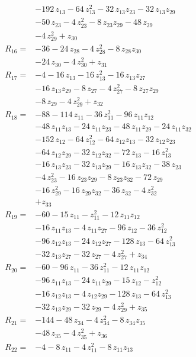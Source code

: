 \begin{align*}
&-192\,z_{13} -64\,z_{13}^{2} -32\,z_{13}z_{23} -32\,z_{13}z_{29}\\
&-50\,z_{23} -4\,z_{23}^{2} -8\,z_{23}z_{29} -48\,z_{29}\\
&-4\,z_{29}^{2} +z_{30}\\[2pt]
R_{16}={}&-36 -24\,z_{28} -4\,z_{28}^{2} -8\,z_{28}z_{30}\\
&-24\,z_{30} -4\,z_{30}^{2} +z_{31}\\[2pt]
R_{17}={}&-4 -16\,z_{13} -16\,z_{13}^{2} -16\,z_{13}z_{27}\\
&-16\,z_{13}z_{29} -8\,z_{27} -4\,z_{27}^{2} -8\,z_{27}z_{29}\\
&-8\,z_{29} -4\,z_{29}^{2} +z_{32}\\[2pt]
R_{18}={}&-88 -114\,z_{11} -36\,z_{11}^{2} -96\,z_{11}z_{12}\\
&-48\,z_{11}z_{13} -24\,z_{11}z_{23} -48\,z_{11}z_{29} -24\,z_{11}z_{32}\\
&-152\,z_{12} -64\,z_{12}^{2} -64\,z_{12}z_{13} -32\,z_{12}z_{23}\\
&-64\,z_{12}z_{29} -32\,z_{12}z_{32} -72\,z_{13} -16\,z_{13}^{2}\\
&-16\,z_{13}z_{23} -32\,z_{13}z_{29} -16\,z_{13}z_{32} -38\,z_{23}\\
&-4\,z_{23}^{2} -16\,z_{23}z_{29} -8\,z_{23}z_{32} -72\,z_{29}\\
&-16\,z_{29}^{2} -16\,z_{29}z_{32} -36\,z_{32} -4\,z_{32}^{2}\\
&+z_{33}\\[2pt]
R_{19}={}&-60 -15\,z_{11} -z_{11}^{2} -12\,z_{11}z_{12}\\
&-16\,z_{11}z_{13} -4\,z_{11}z_{27} -96\,z_{12} -36\,z_{12}^{2}\\
&-96\,z_{12}z_{13} -24\,z_{12}z_{27} -128\,z_{13} -64\,z_{13}^{2}\\
&-32\,z_{13}z_{27} -32\,z_{27} -4\,z_{27}^{2} +z_{34}\\[2pt]
R_{20}={}&-60 -96\,z_{11} -36\,z_{11}^{2} -12\,z_{11}z_{12}\\
&-96\,z_{11}z_{13} -24\,z_{11}z_{29} -15\,z_{12} -z_{12}^{2}\\
&-16\,z_{12}z_{13} -4\,z_{12}z_{29} -128\,z_{13} -64\,z_{13}^{2}\\
&-32\,z_{13}z_{29} -32\,z_{29} -4\,z_{29}^{2} +z_{35}\\[2pt]
R_{21}={}&-144 -48\,z_{34} -4\,z_{34}^{2} -8\,z_{34}z_{35}\\
&-48\,z_{35} -4\,z_{35}^{2} +z_{36}\\[2pt]
R_{22}={}&-4 -8\,z_{11} -4\,z_{11}^{2} -8\,z_{11}z_{13}\\

\end{align*}
